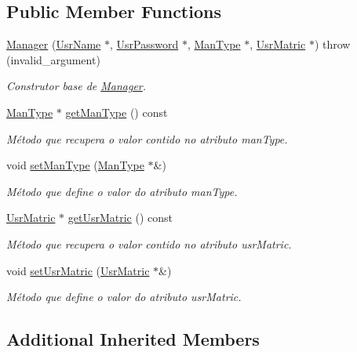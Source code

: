 \subsection*{Public Member Functions}
\begin{DoxyCompactItemize}
\item 
\hyperlink{classManager_a8407145c4ec5fdca8ca79981f45f8512}{Manager} (\hyperlink{classUsrName}{Usr\-Name} $\ast$, \hyperlink{classUsrPassword}{Usr\-Password} $\ast$, \hyperlink{classUsrType}{Man\-Type} $\ast$, \hyperlink{classUsrMatric}{Usr\-Matric} $\ast$)  throw (invalid\-\_\-argument)
\begin{DoxyCompactList}\small\item\em Construtor base de \hyperlink{classManager}{Manager}. \end{DoxyCompactList}\item 
\hyperlink{classUsrType}{Man\-Type} $\ast$ \hyperlink{classManager_ab433b11c8a6fc8316863bc25c1561269}{get\-Man\-Type} () const 
\begin{DoxyCompactList}\small\item\em Método que recupera o valor contido no atributo man\-Type. \end{DoxyCompactList}\item 
void \hyperlink{classManager_ae3089b6e0061dd543adecd7bb73c365b}{set\-Man\-Type} (\hyperlink{classUsrType}{Man\-Type} $\ast$\&)
\begin{DoxyCompactList}\small\item\em Método que define o valor do atributo man\-Type. \end{DoxyCompactList}\item 
\hyperlink{classUsrMatric}{Usr\-Matric} $\ast$ \hyperlink{classManager_acc54618fecef4917e827459539c9e54b}{get\-Usr\-Matric} () const 
\begin{DoxyCompactList}\small\item\em Método que recupera o valor contido no atributo usr\-Matric. \end{DoxyCompactList}\item 
void \hyperlink{classManager_a8927ba1187ab6ba16ef9ae73fd145b1a}{set\-Usr\-Matric} (\hyperlink{classUsrMatric}{Usr\-Matric} $\ast$\&)
\begin{DoxyCompactList}\small\item\em Método que define o valor do atributo usr\-Matric. \end{DoxyCompactList}\end{DoxyCompactItemize}
\subsection*{Additional Inherited Members}


